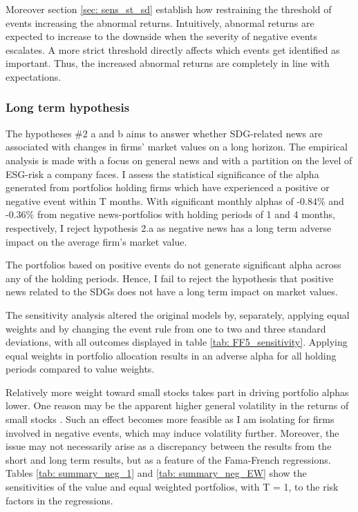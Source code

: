 Moreover section \ref{sec: sens_st_sd} establish how restraining the threshold of events increasing the abnormal returns. Intuitively, abnormal returns are expected to increase to the downside when the severity of negative events escalates. A more strict threshold directly affects which events get identified as important. Thus, the increased abnormal returns are completely in line with expectations.  




\subsubsection{Long term hypothesis}

The hypotheses \#2 a and b aims to answer whether SDG-related news are associated with changes in firms' market values on a long horizon. The empirical analysis is made with a focus on general news and with a partition on the level of ESG-risk a company faces. I assess the statistical significance of the alpha generated from portfolios holding firms which have experienced a positive or negative event within T months. With significant monthly alphas of -0.84\% and -0.36\% from negative news-portfolios with holding periods of 1 and 4 months, respectively, I reject hypothesis 2.a as negative news has a long term adverse impact on the average firm's market value.   

The portfolios based on positive events do not generate significant alpha across any of the holding periods. Hence, I fail to reject the hypothesis that positive news related to the SDGs does not have a long term impact on market values. 

The sensitivity analysis altered the original models by, separately, applying equal weights and by changing the event rule from one to two and three standard deviations, with all outcomes displayed in table \ref{tab: FF5_sensitivity}. Applying equal weights in portfolio allocation results in an adverse alpha for all holding periods compared to value weights. 

Relatively more weight toward small stocks takes part in driving portfolio alphas lower. One reason may be the apparent higher general volatility in the returns of small stocks \citep{Fama_french_3fac}. Such an effect becomes more feasible as I am isolating for firms involved in negative events, which may induce volatility further. Moreover, the issue may not necessarily arise as a discrepancy between the results from the short and long term results, but as a feature of the Fama-French regressions. Tables \ref{tab: summary_neg_1} and \ref{tab: summary_neg_EW} show the sensitivities of the value and equal weighted portfolios, with T = 1, to the risk factors in the regressions. 


